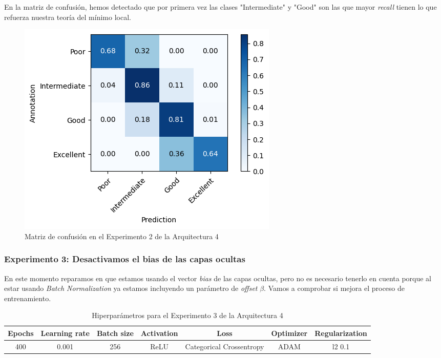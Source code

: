 \documentclass{article}
\begin{document}
			En la matriz de confusi\'on, hemos detectado que por primera vez las clases "Intermediate" y "Good" son las que mayor \textit{recall} tienen lo que refuerza nuestra teor\'ia del m\'inimo local.
			\begin{figure}[!h]
				\begin{center}
					\includegraphics[scale=0.7]{d-cm-a4-e2.png}		
					\caption{Matriz de confusi\'on en el Experimento 2 de la Arquitectura 4}	
					\label{d-cm-a4-e2}
				\end{center}
			\end{figure}
			
		\subsubsection{Experimento 3: Desactivamos el bias de las capas ocultas}
		\label{d-s-a4-e3}
			En este momento reparamos en que estamos usando el vector \textit{bias} de las capas ocultas, pero no es necesario tenerlo en cuenta porque al estar usando \textit{Batch Normalization} ya estamos incluyendo un par\'ametro de \textit{offset} $\beta$. Vamos a comprobar si mejora el proceso de entrenamiento.
			
			\begin{table}[!h]
				\begin{tabular}{| c | c | c | c | c | c | c |}
					\textbf{Epochs} & \textbf{Learning rate} & \textbf{Batch size} & \textbf{Activation} & \textbf{Loss} & \textbf{Optimizer} & \textbf{Regularization} \\ \hline
					400 & 0.001 & 256 & ReLU & Categorical Crossentropy & ADAM & l2 0.1
				\end{tabular}
				\caption{Hiperpar\'ametros para el Experimento 3 de la Arquitectura 4}
				\label{tab:hip-d-a4-e3}
			\end{table}
			
\end{document}
